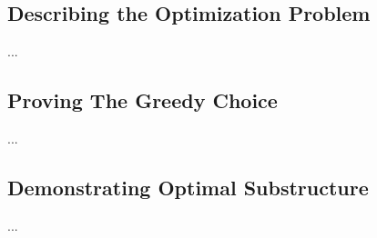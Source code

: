\subsection{Describing the Optimization Problem}
...

\subsection{Proving The Greedy Choice}
...

\subsection{Demonstrating Optimal Substructure}
...

